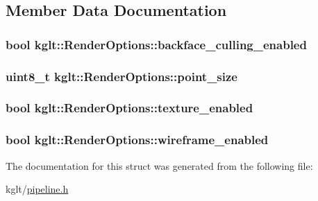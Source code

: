\subsection{Member Data Documentation}
\hypertarget{structkglt_1_1_render_options_ab3a22d50e9d251c07c873de3e9f0aa24}{
\subsubsection[{backface\-\_\-culling\-\_\-enabled}]{\setlength{\rightskip}{0pt plus 5cm}bool kglt\-::\-Render\-Options\-::backface\-\_\-culling\-\_\-enabled}}\label{structkglt_1_1_render_options_ab3a22d50e9d251c07c873de3e9f0aa24}
\hypertarget{structkglt_1_1_render_options_a5c14412ac530a7e1c5bfb85a3b128946}{
\subsubsection[{point\-\_\-size}]{\setlength{\rightskip}{0pt plus 5cm}uint8\-\_\-t kglt\-::\-Render\-Options\-::point\-\_\-size}}\label{structkglt_1_1_render_options_a5c14412ac530a7e1c5bfb85a3b128946}
\hypertarget{structkglt_1_1_render_options_a8549cb8de46d5daa268dbcc89bb95d6e}{
\subsubsection[{texture\-\_\-enabled}]{\setlength{\rightskip}{0pt plus 5cm}bool kglt\-::\-Render\-Options\-::texture\-\_\-enabled}}\label{structkglt_1_1_render_options_a8549cb8de46d5daa268dbcc89bb95d6e}
\hypertarget{structkglt_1_1_render_options_af31dea05738969d557ef9a50c424e805}{
\subsubsection[{wireframe\-\_\-enabled}]{\setlength{\rightskip}{0pt plus 5cm}bool kglt\-::\-Render\-Options\-::wireframe\-\_\-enabled}}\label{structkglt_1_1_render_options_af31dea05738969d557ef9a50c424e805}


The documentation for this struct was generated from the following file\-:\begin{DoxyCompactItemize}
\item 
kglt/\hyperlink{pipeline_8h}{pipeline.\-h}\end{DoxyCompactItemize}
